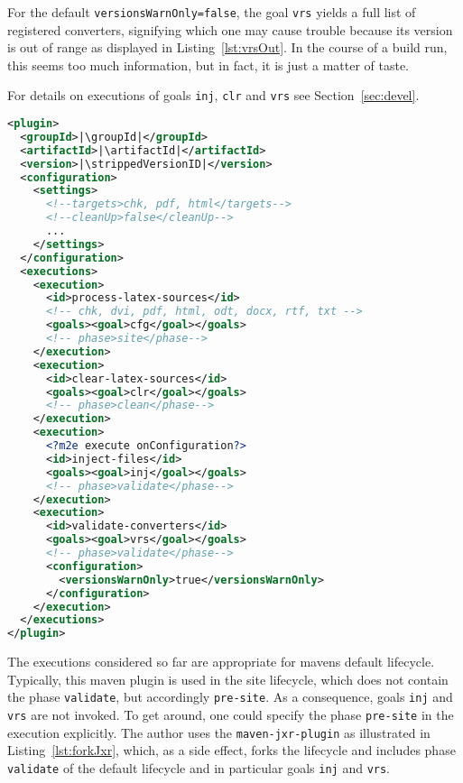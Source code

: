 For the default \texttt{versionsWarnOnly=false}, 
the goal \texttt{vrs} 
yields a full list of registered converters, 
signifying which one may cause trouble 
because its version is out of range
as displayed in Listing~\ref{lst:vrsOut}. 
In the course of a build run, this seems too much information, 
but in fact, it is just a matter of taste. 

For details on executions of goals \texttt{inj}, \texttt{clr} and \texttt{vrs} 
see Section~\ref{sec:devel}. 


\begin{lstlisting}[language=XML, basicstyle=\footnotesize,
escapechar=|,
float, captionpos=hb, label={lst:executions}, 
caption={The executions of this plugin}]
<plugin>
  <groupId>|\groupId|</groupId>
  <artifactId>|\artifactId|</artifactId>
  <version>|\strippedVersionID|</version>
  <configuration>
    <settings>
      <!--targets>chk, pdf, html</targets-->
      <!--cleanUp>false</cleanUp-->
      ...
    </settings>
  </configuration>
  <executions>
    <execution>
      <id>process-latex-sources</id>
      <!-- chk, dvi, pdf, html, odt, docx, rtf, txt -->
      <goals><goal>cfg</goal></goals>
      <!-- phase>site</phase-->
    </execution>
    <execution>
      <id>clear-latex-sources</id>
      <goals><goal>clr</goal></goals>
      <!-- phase>clean</phase-->
    </execution>
    <execution>
      <?m2e execute onConfiguration?>
      <id>inject-files</id>
      <goals><goal>inj</goal></goals>
      <!-- phase>validate</phase-->
    </execution>
    <execution>
      <id>validate-converters</id>
      <goals><goal>vrs</goal></goals>
      <!-- phase>validate</phase-->
      <configuration>
        <versionsWarnOnly>true</versionsWarnOnly>
      </configuration>
    </execution>
  </executions>
</plugin>
\end{lstlisting}

The executions considered so far are appropriate 
for mavens default lifecycle. 
Typically, this maven plugin is used in the site lifecycle, 
which does not contain the phase \texttt{validate}, 
but accordingly \texttt{pre-site}. 
As a consequence, goals \texttt{inj} and \texttt{vrs} are not invoked. 
To get around, 
one could specify the phase \texttt{pre-site} in the execution explicitly. 
The author uses the \texttt{maven-jxr-plugin} 
as illustrated in Listing~\ref{lst:forkJxr}, 
which, as a side effect, forks the lifecycle 
and includes phase \texttt{validate} of the default lifecycle 
and in particular goals \texttt{inj} and \texttt{vrs}. 

